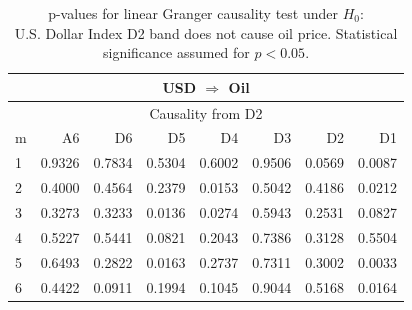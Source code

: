 %
%
\begin{table}[H]
\begin{center}
\begin{tabular}{l|r r r r r r r}
\hline\hline
\multicolumn{8}{c}{USD $\Rightarrow$ Oil}\\
\hline
\multicolumn{8}{c}{Causality from D2}\\
\hline\hline
m & A6 & D6 & D5 & D4 & D3 & D2 & D1 \\
\hline
1 & 0.9326 & 0.7834 & 0.5304 & 0.6002 & 0.9506 & 0.0569 & \cellcolor{mygrey}0.0087 \\
2 & 0.4000 & 0.4564 & 0.2379 & \cellcolor{mygrey}0.0153 & 0.5042 & 0.4186 & \cellcolor{mygreen}0.0212 \\
3 & 0.3273 & 0.3233 & \cellcolor{mygrey}0.0136 & \cellcolor{mygrey}0.0274 & 0.5943 & 0.2531 & 0.0827 \\
4 & 0.5227 & 0.5441 & 0.0821 & 0.2043 & 0.7386 & 0.3128 & 0.5504 \\
5 & 0.6493 & 0.2822 & \cellcolor{mygrey}0.0163 & 0.2737 & 0.7311 & 0.3002 & \cellcolor{mygrey}0.0033 \\
6 & 0.4422 & 0.0911 & 0.1994 & 0.1045 & 0.9044 & 0.5168 & \cellcolor{mygrey}0.0164 \\
\hline\hline
\end{tabular}
\caption{p-values for linear Granger causality test under $H_0$:\\
U.S. Dollar Index D2 band does not cause oil price. Statistical significance assumed for $p<0.05$.}
\end{center}
\end{table}

